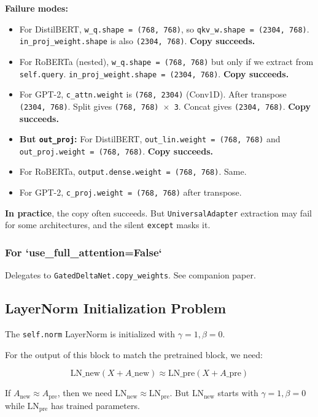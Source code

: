 \textbf{Failure modes:}
\begin{itemize}
\item For DistilBERT, \texttt{w\_q.shape = (768, 768)}, so \texttt{qkv\_w.shape = (2304, 768)}.
  \texttt{in\_proj\_weight.shape} is also \texttt{(2304, 768)}. \textbf{Copy succeeds.}
\item For RoBERTa (nested), \texttt{w\_q.shape = (768, 768)} but only if we extract from
  \texttt{self.query}. \texttt{in\_proj\_weight.shape = (2304, 768)}. \textbf{Copy succeeds.}
\item For GPT-2, \texttt{c\_attn.weight} is \texttt{(768, 2304)} (Conv1D). After transpose
  \texttt{(2304, 768)}. Split gives \texttt{(768, 768) $\times$ 3}. Concat gives \texttt{(2304, 768)}.
  \textbf{Copy succeeds.}
\item \textbf{But \texttt{out\_proj}:} For DistilBERT, \texttt{out\_lin.weight = (768, 768)} and
  \texttt{out\_proj.weight = (768, 768)}. \textbf{Copy succeeds.}
\item For RoBERTa, \texttt{output.dense.weight = (768, 768)}. Same.
\item For GPT-2, \texttt{c\_proj.weight = (768, 768)} after transpose.

\end{itemize}
\textbf{In practice}, the copy often succeeds. But \texttt{UniversalAdapter} extraction 
may fail for some architectures, and the silent \texttt{except} masks it.

\subsubsection{For `use\_full\_attention=False`}

Delegates to \texttt{GatedDeltaNet.copy\_weights}. See companion paper.

\subsection{LayerNorm Initialization Problem}

The \texttt{self.norm} LayerNorm is initialized with $\gamma = 1, \beta = 0$.

For the output of this block to match the pretrained block, we need:

\[
\text{LN}\_\text{new}(X + A\_\text{new}) \approx \text{LN}\_\text{pre}(X + A\_\text{pre})
\tag{4.1}
\]

If $A_\text{new} \approx A_\text{pre}$, then we need 
$\text{LN}_\text{new} \approx \text{LN}_\text{pre}$. But 
$\text{LN}_\text{new}$ starts with $\gamma = 1, \beta = 0$ while 
$\text{LN}_\text{pre}$ has trained parameters.


